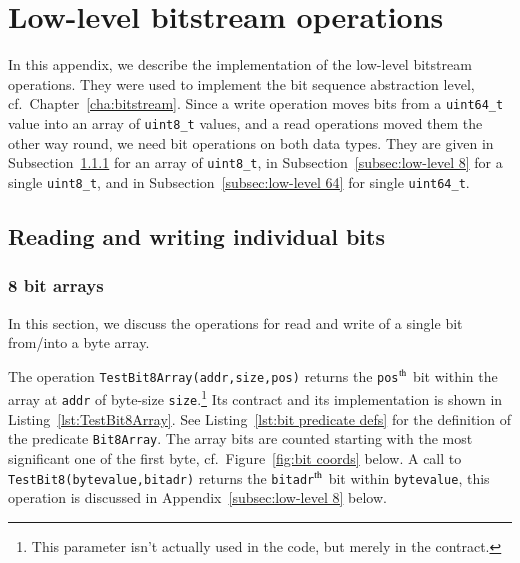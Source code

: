 
\chapter{Low-level bitstream operations}
\label{cha:low-level bitstream}

In this appendix, we describe the implementation of the
low-level bitstream operations.
%
They were used to implement the bit sequence abstraction level, cf.\
Chapter~\ref{cha:bitstream}.
%
Since a write operation moves bits from a \lstinline{uint64_t} value
into an array of \lstinline{uint8_t} values, and a read operations
moved them the other way round,
we need bit operations on both data types.
%
They are given in
Subsection~\ref{subsec:low-level 8 array} 
for an array of \lstinline{uint8_t}, 
in Subsection~\ref{subsec:low-level 8} for a single \lstinline{uint8_t},
and
in Subsection~\ref{subsec:low-level 64} for single \lstinline{uint64_t}.













\section{Reading and writing individual bits}


\subsection{8 bit arrays}
\label{subsec:low-level 8 array}


In this section, we discuss the operations for read and write of a
single bit from/into a byte array.

The operation \lstinline{TestBit8Array(addr,size,pos)} returns the
\lstinline{pos}$^{\mbox{\scriptsize th}}$ bit
within the array at \lstinline{addr}
of byte-size \lstinline{size}.\footnote{
	This parameter isn't actually used in the code, but merely
	in the contract.
}
Its contract and its implementation is shown in
Listing~\ref{lst:TestBit8Array}.
%
See Listing~\ref{lst:bit predicate defs} for the definition of the predicate
\lstinline{Bit8Array}.
%
The array bits are counted starting with the most significant one of
the first byte,
cf.\ Figure~\ref{fig:bit coords} below.
%
A call to \lstinline{TestBit8(bytevalue,bitadr)} returns the 
\lstinline{bitadr}$^{\mbox{\scriptsize th}}$ bit
within \lstinline{bytevalue}, this operation is discussed in
Appendix~\ref{subsec:low-level 8} below.








